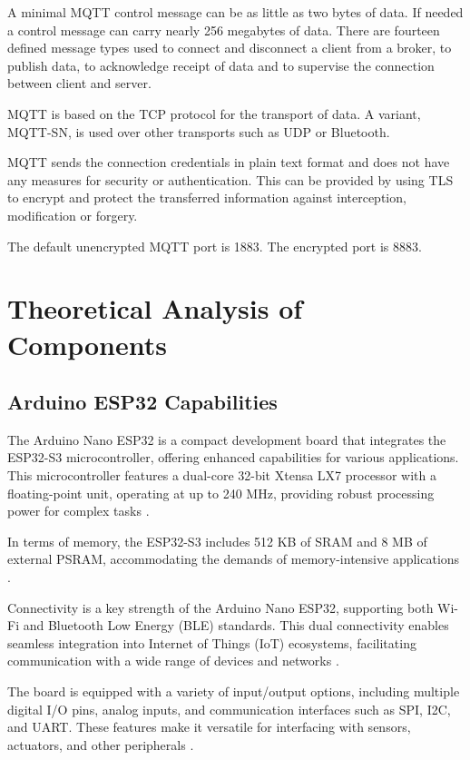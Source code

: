 \documentclass[12pt,a4paper,oneside,english]{book}
\begin{document}
A minimal MQTT control message can be as little as two bytes of data. If needed a control message can carry nearly 256 megabytes of data. There are fourteen defined message types used to connect and disconnect a client from a broker, to publish data, to acknowledge receipt of data and to supervise the connection between client and server.

MQTT is based on the TCP protocol for the transport of data. A variant, MQTT-SN, is used over other transports such as UDP or Bluetooth.

MQTT sends the connection credentials in plain text format and does not have any measures for security or authentication. This can be provided by using TLS to encrypt and protect the transferred information against interception, modification or forgery.

The default unencrypted MQTT port is 1883. The encrypted port is 8883.




\section{Theoretical Analysis of Components}
\subsection{Arduino ESP32 Capabilities}
The Arduino Nano ESP32 is a compact development board that integrates the ESP32-S3 microcontroller, offering enhanced capabilities for various applications. This microcontroller features a dual-core 32-bit Xtensa LX7 processor with a floating-point unit, operating at up to 240 MHz, providing robust processing power for complex tasks \citep{arduino2023}.

In terms of memory, the ESP32-S3 includes 512 KB of SRAM and 8 MB of external PSRAM, accommodating the demands of memory-intensive applications \citep{arduino2023}.

Connectivity is a key strength of the Arduino Nano ESP32, supporting both Wi-Fi and Bluetooth Low Energy (BLE) standards. This dual connectivity enables seamless integration into Internet of Things (IoT) ecosystems, facilitating communication with a wide range of devices and networks \citep{arduino2023}.

The board is equipped with a variety of input/output options, including multiple digital I/O pins, analog inputs, and communication interfaces such as SPI, I2C, and UART. These features make it versatile for interfacing with sensors, actuators, and other peripherals \citep{arduino2023}.
\end{document}

